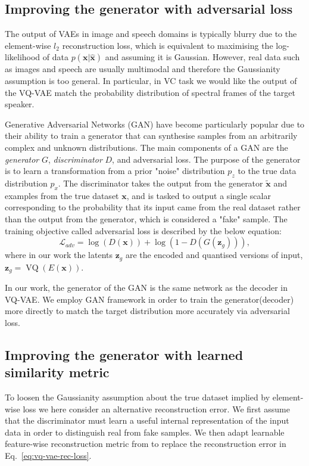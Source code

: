\documentclass{article}
\DeclareMathOperator{\VQ}{VQ}
\begin{document}
\subsection{Improving the generator with adversarial loss}
\label{sec:methodology:adversarial-loss}
The output of VAEs in image and speech domains is typically blurry due to the element-wise $l_2$ reconstruction loss, which is equivalent to maximising the log-likelihood of data $p(\mathbf{x}|\mathbf{\hat x})$ and assuming it is Gaussian. However, real data such as images and speech are usually multimodal and therefore the Gaussianity assumption is too general. In particular, in VC task we would like the output of the VQ-VAE match the probability distribution of spectral frames of the target speaker.

Generative Adversarial Networks (GAN) \cite{Goodfellow2014} have become particularly popular due to their ability to train a generator that can synthesise samples from an arbitrarily complex and unknown distributions. 
The main components of a GAN are the \textit{generator} $G$, \textit{discriminator} $D$, and adversarial loss. 
The purpose of the generator is to learn a transformation from a prior "noise" distribution $p_z$ to the true data distribution $p_x$. 
The discriminator takes the output from the generator $\mathbf{\tilde x}$ and examples from the true dataset $\mathbf{x}$, and is tasked to output a single scalar corresponding to the probability that its input came from the real dataset rather than the output from the generator, which is considered a "fake" sample. The training objective called adversarial loss is described by the below equation:
\begin{equation}
    \mathcal{L}_{adv} = \log(D(\mathbf{x})) + \log(1-D(G(\mathbf{z}_g))),
\end{equation}
where in our work the latents $\mathbf{z}_g$ are the encoded and quantised versions of input, $\mathbf{z}_g = \VQ(E(\mathbf{x}))$.

In our work, the generator of the GAN is the same network as the decoder in VQ-VAE.
We employ GAN framework in order to train the generator(decoder) more directly to match the target distribution more accurately via adversarial loss.


\subsection{Improving the generator with learned similarity metric}
To loosen the Gaussianity assumption about the true dataset implied by element-wise loss we here consider an alternative reconstruction error. We first assume that the discriminator must learn a useful internal representation of the input data in order to distinguish real from fake samples. We then adapt learnable feature-wise reconstruction metric from \citet{Larsen2015} to replace the reconstruction error in Eq.~\ref{eq:vq-vae-rec-loss}.
\end{document}
